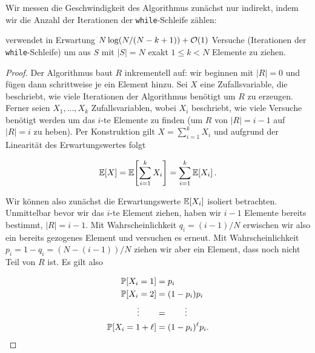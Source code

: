 \bigskip

Wir messen die Geschwindigkeit des Algorithmus zunächst nur indirekt, indem wir die Anzahl der Iterationen der \texttt{while}-Schleife zählen:

\begin{lemma}\label{lemma:basis-ziehen-ohne-zuruecklegen-versuche}
     verwendet in Erwartung $N \log(N/(N-k+1)) + \mathcal{O}\!\left(1\right)$ Versuche (Iterationen der \texttt{while}-Schleife) um aus $S$ mit $|S| = N$ exakt $1 \le k < N$ Elemente zu ziehen.
\end{lemma}

\begin{proof}
    Der Algorithmus baut $R$ inkrementell auf: wir beginnen mit $|R| = 0$ und fügen dann schrittweise je ein Element hinzu.
    Sei $X$ eine Zufallsvariable, die beschriebt, wie viele Iterationen der Algorithmus benötigt um $R$ zu erzeugen.
    Ferner seien $X_1, \ldots, X_k$ Zufallsvariablen, wobei $X_i$ beschriebt, wie viele Versuche benötigt werden um das $i$-te Elemente zu finden (\dh um $R$ von $|R| = i - 1$ auf  $|R| = i$ zu heben).
    Per Konstruktion gilt $X = \sum_{i=1}^k X_i$ und aufgrund der Linearität des Erwartungswertes folgt

    \begin{equation}
        \mathbb{E}\!\left[X\right] = \mathbb{E}\!\left[\sum_{i=1}^k X_i\right] = \sum_{i=1}^k \mathbb{E}\!\left[X_i\right]. \label{eq:basis-ziehen-ohne-zuruecklegen_expvX}
    \end{equation}

    Wir können also zunächst die Erwartungswerte $\mathbb{E}\!\left[X_i\right]$ isoliert betrachten.
    Unmittelbar bevor wir das $i$-te Element ziehen, haben wir $i-1$ Elemente bereits bestimmt, \dh $|R| = i - 1$.
    Mit Wahrscheinlichkeit $q_i = (i-1) / N$ erwischen wir also ein bereits gezogenes Element und versuchen es erneut.
    Mit Wahrscheinlichkeit $p_i = 1 - q_i = (N - (i - 1)) / N$ ziehen wir aber ein Element, dass noch nicht Teil von $R$ ist.
    Es gilt also

    \begin{align*}
        \mathbb{P}\!\left[X_i = 1\right]            & = p_i                  \\
        \mathbb{P}\!\left[X_i = 2\right]            & = (1 -p_i) p_i         \\
        \vdots         \quad\quad & = \quad\quad \vdots    \\
        \mathbb{P}\!\left[X_i = 1 + \ell\right]     & = (1- p_i)^{\ell} p_i.
    \end{align*}


\end{proof}
